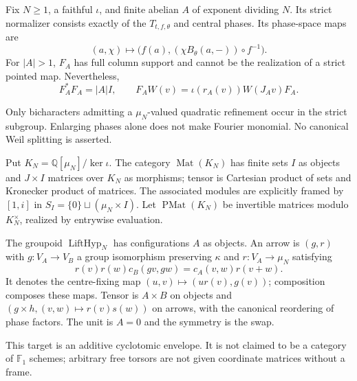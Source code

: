 \begin{theorem}
{\normalfont\statusProved}\quad Fix $N\geq1$, a faithful $\iota$, and finite
abelian $A$ of exponent dividing $N$. Its strict normalizer consists exactly of the
$T_{t,f,\theta}$ and central phases. Its phase-space maps are
\[
(a,\chi)\longmapsto
\bigl(f(a),(\chi B_\theta(a,-))\circ f^{-1}\bigr).
\]
For $|A|>1$, $F_A$ has full column support and cannot be the realization
of a strict pointed map. Nevertheless,
\[
F_A^*F_A=|A|I,\qquad
F_AW(v)=\iota(r_A(v))W(J_Av)F_A.
\]
\end{theorem}
\begin{scope}Only bicharacters admitting a $\mu_N$-valued quadratic
refinement occur in the strict subgroup. Enlarging phases alone does not
make Fourier monomial. No canonical Weil splitting is asserted.\end{scope}

\begin{definition}
Put $K_N=\mathbb Q[\mu_N]/\ker\iota$. The category $\operatorname{Mat}(K_N)$
has finite sets $I$ as objects and $J\times I$ matrices over $K_N$ as
morphisms; tensor is Cartesian product of sets and Kronecker product of
matrices. The associated modules are explicitly framed by $[1,i]$ in
$S_I=\{0\}\sqcup(\mu_N\times I)$. Let $\operatorname{PMat}(K_N)$ be
invertible matrices modulo $K_N^\times$, realized by entrywise evaluation.

The groupoid $\operatorname{LiftHyp}_N$ has configurations $A$ as objects.
An arrow is $(g,r)$ with $g:V_A\to V_B$ a group isomorphism preserving
$\kappa$ and $r:V_A\to\mu_N$ satisfying
\[
r(v)r(w)c_B(gv,gw)=c_A(v,w)r(v+w).
\]
It denotes the centre-fixing map $(u,v)\mapsto(ur(v),g(v))$; composition
composes these maps. Tensor is $A\times B$ on objects and
$(g\times h,(v,w)\mapsto r(v)s(w))$ on arrows, with the canonical
reordering of phase factors. The unit is $A=0$ and the symmetry is the swap.
\end{definition}
\begin{scope}This target is an additive cyclotomic envelope. It is not
claimed to be a category of $\mathbb F_1$ schemes; arbitrary free torsors
are not given coordinate matrices without a frame.\end{scope}

